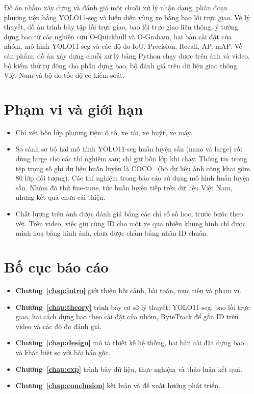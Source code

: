 Đồ án nhằm xây dựng và đánh giá một chuỗi xử lý nhận dạng, phân đoạn phương tiện bằng YOLO11-seg và biểu diễn vùng xe bằng bao lồi trực giao.
Về lý thuyết, đồ án trình bày tập lồi trực giao, bao lồi trực giao liên thông, ý tưởng dựng bao từ các nghiên cứu O-Quickhull và O-Graham, hai bản cài đặt của nhóm, mô hình YOLO11-seg và các độ đo IoU, Precision, Recall, AP, mAP.
Về sản phẩm, đồ án xây dựng chuỗi xử lý bằng Python chạy được trên ảnh và video, bộ kiểm thử tự động cho phần dựng bao, bộ đánh giá trên dữ liệu giao thông Việt Nam và bộ đo tốc độ có kiểm soát.

\section{Phạm vi và giới hạn}
\begin{itemize}
  \item Chỉ xét bốn lớp phương tiện: ô tô, xe tải, xe buýt, xe máy.
  \item So sánh sơ bộ hai mô hình YOLO11-seg huấn luyện sẵn (nano và large) rồi dùng large cho các thí nghiệm sau; chỉ giữ bốn lớp khi chạy.
        Thông tin trong tệp trọng số ghi dữ liệu huấn luyện là COCO~\cite{lin2014coco} (bộ dữ liệu ảnh công khai gồm 80 lớp đối tượng). Các thí nghiệm trong báo cáo sử dụng mô hình huấn luyện sẵn. Nhóm đã thử fine-tune, tức huấn luyện tiếp trên dữ liệu Việt Nam, nhưng kết quả chưa cải thiện.
  \item Chất lượng trên ảnh được đánh giá bằng các chỉ số số học, trước bước theo vết. Trên video, việc giữ cùng ID cho một xe qua nhiều khung hình chỉ được minh hoạ bằng hình ảnh, chưa được chấm bằng nhãn ID chuẩn.
\end{itemize}

\section{Bố cục báo cáo}
\begin{itemize}
  \item \textbf{Chương~\ref{chap:intro}} giới thiệu bối cảnh, bài toán, mục tiêu và phạm vi.
  \item \textbf{Chương~\ref{chap:theory}} trình bày cơ sở lý thuyết: YOLO11-seg, bao lồi trực giao, hai cách dựng bao theo cài đặt của nhóm, ByteTrack để gắn ID trên video và các độ đo đánh giá.
  \item \textbf{Chương~\ref{chap:design}} mô tả thiết kế hệ thống, hai bản cài đặt dựng bao và khác biệt so với bài báo gốc.
  \item \textbf{Chương~\ref{chap:exp}} trình bày dữ liệu, thực nghiệm và thảo luận kết quả.
  \item \textbf{Chương~\ref{chap:conclusion}} kết luận và đề xuất hướng phát triển.
\end{itemize}
